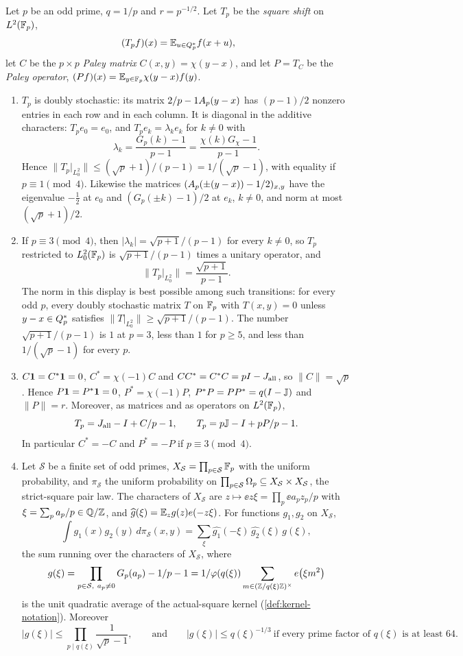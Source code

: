 \begin{lemma}\label{lem:square-shift}
Let $p$ be an odd prime, $q=1/p$ and $r=p^{-1/2}$. Let $T_p$ be the
\emph{square shift} on $L^2(\mathbb F_p)$,
\[
 (T_pf)(x)=\mathbb E_{u\in Q_{p}^{*}}f(x+u),
\]
let $C$ be the $p\times p$ \emph{Paley matrix} $C(x,y)=\chi(y-x)$, and let
$P=T_C$ be the \emph{Paley operator}, $(Pf)(x)=\mathbb E_{y\in\mathbb F_p}\chi(y-x)f(y)$.
\begin{enumerate}[label=\textup{(\alph*)}]
\item $T_p$ is doubly stochastic: its matrix $2/p-1A_{p}(y-x)$ has
 $(p-1)/2$ nonzero entries in each row and in each column. It is diagonal in
 the additive characters: $T_pe_0=e_0$, and $T_pe_k=\lambda_ke_k$ for $k\ne0$
 with
 \[
  \lambda_k=\frac{G_p(k)-1}{p-1}=\frac{\chi(k)G_\chi-1}{p-1}.
 \]
 Hence $\|T_p|_{L^2_0}\|\le(\sqrt p+1)/(p-1)=1/(\sqrt p-1)$, with equality if
 $p\equiv1\pmod4$. Likewise the matrices $(A_{p}(\pm(y-x))-1/2)_{x,y}$ have
 the eigenvalue $-\frac12$ at $e_0$ and $(G_p(\pm k)-1)/2$ at $e_k$, $k\ne0$,
 and norm at most $(\sqrt p+1)/2$.
\item If $p\equiv3\pmod4$, then $|\lambda_k|=\sqrt{p+1}/(p-1)$ for every
 $k\ne0$, so $T_p$ restricted to $L^2_0(\mathbb F_p)$ is $\sqrt{p+1}/(p-1)$ times a
 unitary operator, and
 \[
  \|T_p|_{L^2_0}\|=\frac{\sqrt{p+1}}{p-1}.
 \]
 The norm in this display is best possible among such transitions: for every odd $p$, every doubly stochastic matrix $T$ on
 $\mathbb F_p$ with $T(x,y)=0$ unless $y-x\in Q_{p}^{*}$ satisfies
 $\|T|_{L^2_0}\|\ge\sqrt{p+1}/(p-1)$. The number $\sqrt{p+1}/(p-1)$ is $1$ at
 $p=3$, less than $1$ for $p\ge5$, and less than $1/(\sqrt p-1)$ for every $p$.
\item $C\mathbf 1=C^*\mathbf 1=0$, $C^*=\chi(-1)C$ and $CC^*=C^*C=pI-J_{\mathrm{all}}$, so
 $\|C\|=\sqrt p$. Hence $P\mathbf 1=P^*\mathbf 1=0$, $P^*=\chi(-1)P$,
 $P^*P=PP^*=q(I-\mathbb J)$ and $\|P\|=r$. Moreover, as matrices and as
 operators on $L^2(\mathbb F_p)$,
 \[
  T_p=J_{\mathrm{all}}-I+C/p-1,\qquad T_p=p\mathbb J-I+pP/p-1.
 \]
 In particular $C^*=-C$ and $P^*=-P$ if $p\equiv3\pmod4$.
\item Let $\mathcal S$ be a finite set of odd primes,
 $X_{\mathcal S}=\prod_{p\in\mathcal S}\mathbb F_p$ with the uniform probability, and
 $\pi_{\mathcal S}$ the uniform probability on
 $\prod_{p\in\mathcal S}\Omega_{p}\subseteq X_{\mathcal S}\times X_{\mathcal S}$, the
 strict-square pair law. The characters of $X_{\mathcal S}$ are
 $z\mapsto\ee{z\xi}=\prod_p\ee{a_pz_p/p}$ with $\xi=\sum_pa_p/p\in\mathbb Q/\mathbb Z$, and
 $\widehat g(\xi)=\mathbb E_zg(z)e\!\left(-z\xi\right)$. For functions $g_1,g_2$ on
 $X_{\mathcal S}$,
 \[
  \int g_1(x)g_2(y)\,d\pi_{\mathcal S}(x,y)=\sum_{\xi}\widehat{g_1}(-\xi)\,\widehat{g_2}(\xi)\,g(\xi),
 \]
 the sum running over the characters of $X_{\mathcal S}$, where
 \[
  g(\xi)=\prod_{p\in\mathcal S,\ a_p\ne0}\frac{G_p(a_p)-1}{p-1}
  =\frac1{\varphi(q(\xi))}\sum_{m\in(\Z/q(\xi)\Z)^\times}\ee{\xi m^2}
 \]
 is the unit quadratic average of the actual-square kernel
 (\cref{def:kernel-notation}). Moreover
 \[
  |g(\xi)|\le\prod_{p\mid q(\xi)}\frac1{\sqrt p-1},\qquad\text{and}\qquad
  |g(\xi)|\le q(\xi)^{-1/3}\ \text{if every prime factor of $q(\xi)$ is at least $64$.}
 \]
\end{enumerate}
\end{lemma}

